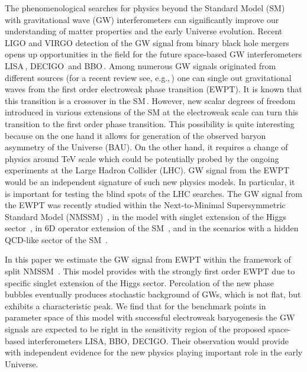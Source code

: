 \documentclass[12pt]{article}
\begin{document}
The phenomenological searches for physics beyond the Standard Model
(SM)  with gravitational wave (GW) interferometers can significantly
improve our understanding of matter properties and the early Universe 
evolution. Recent LIGO and VIRGO detection of the GW signal 
from binary black hole mergers
\cite{Abbott:2016blz,Abbott:2016nmj,Abbott:2017vtc}
opens up opportunities in the field for the future space-based
GW interferometers LISA\,\cite{Seoane:2013qna,Audley:2017drz}, DECIGO\,\cite{Seto:2001qf,Kudoh:2005as} and
BBO\,\cite{Harry:2006fi}. Among numerous GW signals
originated from different sources (for a recent review see,
e.g.,\,\cite{Cai:2017cbj}) one can single out gravitational 
waves from the first order electroweak phase transition (EWPT). It is
known that this transition is a crossover in the SM\,\cite{Kajantie:1996mn,Csikor:1998eu}. However,
new scalar degrees of freedom introduced in various extensions of the SM 
at the electroweak scale  
can turn this transition to
the first order phase transition. This possibility is quite
interesting because on the one hand it allows for
generation of the observed baryon asymmetry of the Universe (BAU). On
the other hand, it requires a change of physics around TeV scale which
could be potentially probed by the ongoing experiments at the
Large Hadron Collider (LHC). GW signal from the EWPT would be an independent
signature of such new physics models. In particular, it is important
for testing the blind spots of the LHC searches. The GW signal from the EWPT was
recently studied within the Next-to-Minimal Supersymmetric Standard
Model (NMSSM)~\cite{Bian:2017wfv}, in the model with
singlet extension of the Higgs
sector~\cite{Kakizaki:2015wua,Beniwal:2017eik}, in 6D operator extension  
of the SM~\cite{Huang:2016odd}, and  in the scenarios with a hidden QCD-like
sector of the SM~\cite{Aoki:2017aws, Anand:2017kar}.  

In this paper we  estimate the GW signal from EWPT within the
framework of split  NMSSM~\cite{Demidov:2006zz,Demidov:2016wcv}. This
model provides with the strongly first order EWPT due to specific
singlet extension of the Higgs sector. Percolation of the new phase
bubbles eventually produces stochastic background of GWs, which is not
flat, but exhibits a characteristic peak. We find that for the benchmark
points in parameter space of this model with successful electroweak
baryogenesis the GW signals are expected to be right  
in the sensitivity region of
the proposed space-based interferometers LISA, BBO, DECIGO. Their
observation would provide with independent evidence for the new
physics playing important role in the early Universe. 
\end{document}
